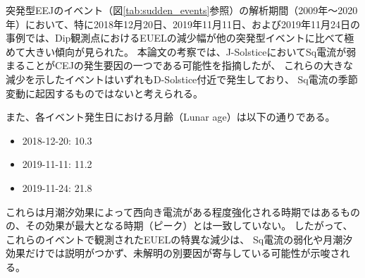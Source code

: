 突発型EEJのイベント（図\ref{tab:sudden_events}参照）の解析期間（2009年〜2020年）において、特に2018年12月20日、2019年11月11日、および2019年11月24日の事例では、Dip観測点におけるEUELの減少幅が他の突発型イベントに比べて極めて大きい傾向が見られた。
本論文の考察では、J-SolsticeにおいてSq電流が弱まることがCEJの発生要因の一つである可能性を指摘したが、
これらの大きな減少を示したイベントはいずれもD-Solstice付近で発生しており、
Sq電流の季節変動に起因するものではないと考えられる。

また、各イベント発生日における月齢（Lunar age）は以下の通りである。
\begin{itemize}
    \item 2018-12-20: 10.3
    \item 2019-11-11: 11.2
    \item 2019-11-24: 21.8
\end{itemize}
これらは月潮汐効果によって西向き電流がある程度強化される時期ではあるものの、その効果が最大となる時期（ピーク）とは一致していない。
したがって、これらのイベントで観測されたEUELの特異な減少は、
Sq電流の弱化や月潮汐効果だけでは説明がつかず、未解明の別要因が寄与している可能性が示唆される。
